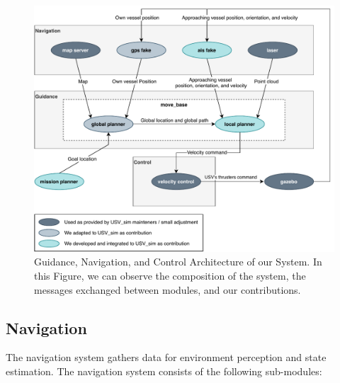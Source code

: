     \begin{figure}
        \centering
        \includegraphics[scale=0.9]{figs/Chap4/usv_arch.pdf}
        \caption{Guidance, Navigation, and Control Architecture of our System. In this Figure, we can observe the composition of the system, the messages exchanged between modules, and our contributions.}
        \label{fig:gnc_arch}
    \end{figure}
    
        \subsection{Navigation}
    \label{sec:chap4_navigation}
    The navigation system gathers data for environment perception and state estimation. The navigation system consists of the following sub-modules:
    
